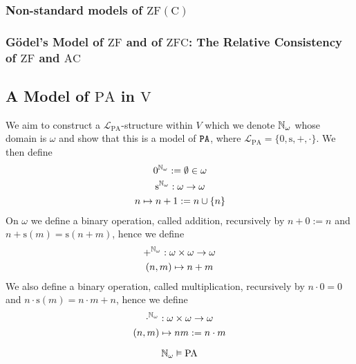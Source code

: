 \subsubsection{Non-standard models of $\mathrm{ZF(C)}$}
\subsubsection{Gödel's Model of $\mathrm{ZF}$ and of $\mathrm{ZFC}$: The Relative Consistency of $\mathrm{ZF}$ and $\mathrm{AC}$}
\subsection{A Model of $\mathrm{PA}$ in $\mathrm{V}$}
We aim to construct a $\mathcal{L}_{\mathrm{PA}}$-structure within $V$ which we denote $\mathbb{N}_{\omega}$ whose domain is $\omega$ and show that this is a model of $\verb|PA|$, where $\mathcal{L}_{\mathrm{PA}}=\{0,\mathrm{s},+,\cdot\}$. We then define 
\begin{gather*}
    0^{\mathbb{N}_\omega} := \emptyset\in \omega\\
    \mathrm{s}^{\mathbb{N}_\omega} : \omega \rightarrow \omega\\
    n \mapsto n+1:= n\cup\{n\}\\
\end{gather*}
On $\omega$ we define a binary operation, called addition, recursively by $n+0:= n$ and $n+\mathrm{s}(m)=\mathrm{s}(n+m)$, hence we define 
\begin{gather*}
    +^{\mathbb{N}_\omega}: \omega \times \omega \rightarrow \omega\\
    (n,m) \mapsto n+m
\end{gather*}
We also define a binary operation, called multiplication, recursively by $n\cdot 0 = 0$ and $n\cdot \mathrm{s}(m)= n\cdot m+n$, hence we define 
\begin{gather*}
    \cdot^{\mathbb{N}_\omega}: \omega\times \omega \rightarrow \omega\\
    (n,m)\mapsto nm := n\cdot m
\end{gather*}
\begin{theorem}
    $$\mathbb{N}_\omega \vDash \mathrm{PA}$$
\end{theorem}
